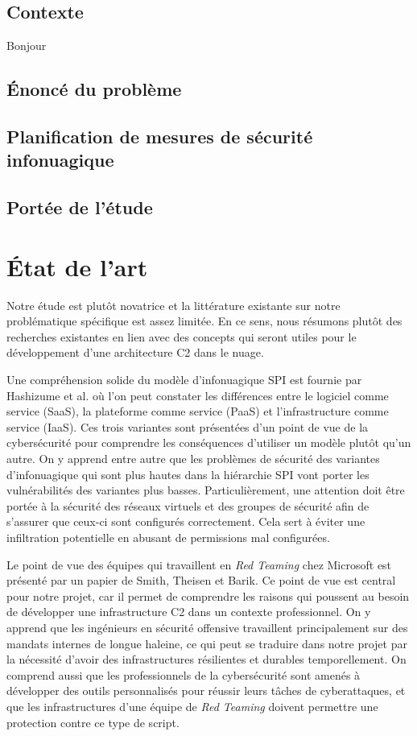 \documentclass[conference]{IEEEtran}
\begin{document}
\subsection{Contexte}
Bonjour
\subsection{Énoncé du problème}

\subsection{Planification de mesures de sécurité infonuagique}

\subsection{Portée de l'étude}

\section{État de l'art}
Notre étude est plutôt novatrice et la littérature existante sur notre problématique spécifique est assez limitée. En ce sens, nous résumons plutôt des recherches existantes en lien avec des concepts qui seront utiles pour le développement d'une architecture C2 dans le nuage.


Une compréhension solide du modèle d'infonuagique SPI est fournie par Hashizume et al. où l'on peut constater les différences entre le logiciel comme service (SaaS), la plateforme comme service (PaaS) et l'infrastructure comme service (IaaS). Ces trois variantes sont présentées d'un point de vue de la cybersécurité pour comprendre les conséquences d'utiliser un modèle plutôt qu'un autre. On y apprend entre autre que les problèmes de sécurité des variantes d'infonuagique qui sont plus hautes dans la hiérarchie SPI vont porter les vulnérabilités des variantes plus basses. Particulièrement, une attention doit être portée à la sécurité des réseaux virtuels et des groupes de sécurité afin de s'assurer que ceux-ci sont configurés correctement. Cela sert à éviter une infiltration potentielle en abusant de permissions mal configurées.


Le point de vue des équipes qui travaillent en \textit{Red Teaming} chez Microsoft est présenté par un papier de Smith, Theisen et Barik. Ce point de vue est central pour notre projet, car il permet de comprendre les raisons qui poussent au besoin de développer une infrastructure C2 dans un contexte professionnel. On y apprend que les ingénieurs en sécurité offensive travaillent principalement sur des mandats internes de longue haleine, ce qui peut se traduire dans notre projet par la nécessité d'avoir des infrastructures résilientes et durables temporellement. On comprend aussi que les professionnels de la cybersécurité sont amenés à développer des outils personnalisés pour réussir leurs tâches de cyberattaques, et que les infrastructures d'une équipe de \textit{Red Teaming} doivent permettre une protection contre ce type de script.
\end{document}
